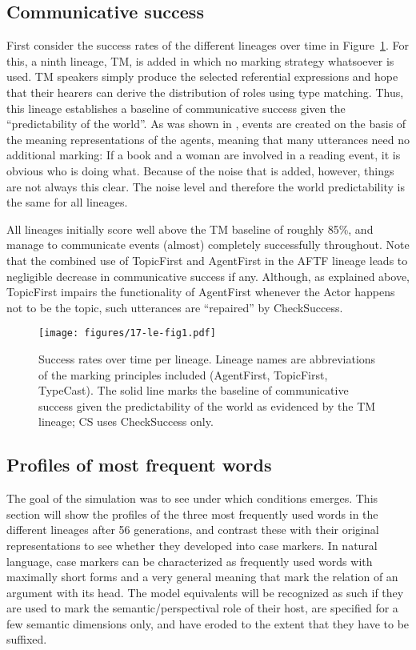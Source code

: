 \documentclass[output=paper]{LSP/langsci}
\begin{document}
\subsection{Communicative success}\label{17-le-sec:Communicative-Success}
First consider the success rates of the different lineages over time in Figure~\ref{17-le-fig:1}. For this, a ninth lineage, TM, is added in which no marking strategy whatsoever is used. TM speakers simply produce the selected referential expressions and hope that their hearers can derive the distribution of roles using type matching. Thus, this lineage establishes a baseline of communicative success given the ``predictability of the world''. As was shown in , events are created on the basis of the meaning representations of the agents, meaning that many utterances need no additional marking: If a book and a woman are involved in a reading event, it is obvious who is doing what. Because of the noise that is added, however, things are not always this clear. The noise level and therefore the world predictability is the same for all lineages. 

All lineages initially score well above the TM baseline of roughly 85\%, and manage to communicate events (almost) completely successfully throughout. Note that the combined use of TopicFirst and AgentFirst in the AFTF lineage leads to negligible decrease in communicative success if any. Although, as explained above, TopicFirst impairs the functionality of AgentFirst whenever the Actor happens not to be the topic, such utterances are ``repaired'' by CheckSuccess. 

\begin{figure}
\texttt{[image: figures/17-le-fig1.pdf]}
\caption{Success rates over time per lineage. Lineage names are abbreviations of the marking principles included (AgentFirst, TopicFirst, TypeCast). The solid line marks the baseline of communicative success given the predictability of the world as evidenced by the TM lineage; CS uses CheckSuccess only.}\label{17-le-fig:1}
\end{figure}

\largerpage
\subsection{Profiles of most frequent words}\label{17-le-sec:Frequent-Words}
The goal of the simulation was to see under which conditions  emerges. This section will show the profiles of the three most frequently used words in the different lineages after 56 generations, and contrast these with their original representations to see whether they developed into case markers. In natural language, case markers can be characterized as frequently used words with maximally short forms and a very general meaning that mark the relation of an argument with its head. The model equivalents will be recognized as such if they are used to mark the semantic/perspectival role of their host, are specified for a few semantic dimensions only, and have eroded to the extent that they have to be suffixed. 
\end{document}
